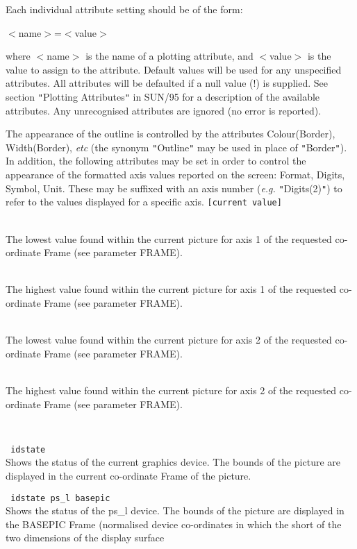 \documentclass[twoside,11pt]{article}
\newcommand{\htmlref}[2]{#1}
\newcommand{\sstexamples}[1]{
   \goodbreak
   \item[Examples:] \mbox{} \\
   \vspace{-3.5ex}
   \begin{description}
      #1
   \end{description}
}
\newcommand{\sstsubsection}[1]{ \item[{#1}] \mbox{} \\}
\newcommand{\sstexamplesubsection}[2]{\sloppy \item{\ssttt #1} \mbox{} \\ #2 }
\newcommand{\ssttt}{\tt}
\newcommand{\sstexamples}[1]{%
      \item[\htmlref{Examples:}{ap:example}]%
      \begin{description}
         #1
      \end{description}
   }
\newcommand{\sstsubsection}[1]{\item[{#1}]}
\newcommand{\sstexamplesubsection}[2]{%
      \item[{\ssttt #1}]
      #2\smallskip%
   }
\begin{document}
{{{         Each individual attribute setting should be of the form:

            $<$name$>$=$<$value$>$

         where $<$name$>$ is the name of a plotting attribute, and $<$value$>$ is
         the value to assign to the attribute. Default values will be
         used for any unspecified attributes. All attributes will be
         defaulted if a null value (!) is supplied. See section {\tt "}Plotting
         Attributes{\tt "} in SUN/95 for a description of the available
         attributes. Any unrecognised attributes are ignored (no error is
         reported).

         The appearance of the outline is controlled by the attributes
         Colour(Border), Width(Border), \emph{etc} (the synonym {\tt "}Outline{\tt "} may be
         used in place of {\tt "}Border{\tt "}). In addition, the following attributes
         may be set in order to control the appearance of the formatted axis
         values reported on the screen: Format, Digits, Symbol, Unit. These
         may be suffixed with an axis number (\emph{e.g.} {\tt "}Digits(2){\tt "}) to refer to
         the values displayed for a specific axis. {\tt [current value]}
      }
      \sstsubsection{
         X1 = LITERAL (Write)
      }{
         The lowest value found within the current picture for axis 1 of the
         requested co-ordinate Frame (see parameter FRAME).
      }
      \sstsubsection{
         X2 = LITERAL (Write)
      }{
         The highest value found within the current picture for axis 1 of the
         requested co-ordinate Frame (see parameter FRAME).
      }
      \sstsubsection{
         Y1 = LITERAL (Write)
      }{
         The lowest value found within the current picture for axis 2 of the
         requested co-ordinate Frame (see parameter FRAME).
      }
      \sstsubsection{
         Y2 = LITERAL (Write)
      }{
         The highest value found within the current picture for axis 2 of the
         requested co-ordinate Frame (see parameter FRAME).
      }
   }
   \sstexamples{
      \sstexamplesubsection{
         idstate
      }{
         Shows the status of the current graphics device. The bounds of
         the picture are displayed in the current co-ordinate Frame of
         the picture.
      }
      \sstexamplesubsection{
         idstate ps\_l basepic
      }{
         Shows the status of the ps\_l device. The bounds of the picture
         are displayed in the BASEPIC Frame (normalised device co-ordinates
         in which the short of the two dimensions of the display surface
}}}
\end{document}
